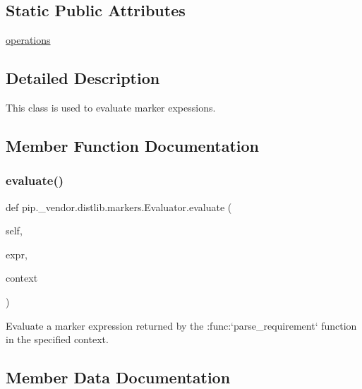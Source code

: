 \subsection*{Static Public Attributes}
\begin{DoxyCompactItemize}
\item 
\hyperlink{classpip_1_1__vendor_1_1distlib_1_1markers_1_1Evaluator_aa643b055c13248781a9455d64e7a45e0}{operations}
\end{DoxyCompactItemize}


\subsection{Detailed Description}
\begin{DoxyVerb}This class is used to evaluate marker expessions.
\end{DoxyVerb}
 

\subsection{Member Function Documentation}
\mbox{\label{classpip_1_1__vendor_1_1distlib_1_1markers_1_1Evaluator_aa4ac9be35d86c0601dfab712e2e47d5a}} 
\subsubsection{\texorpdfstring{evaluate()}{evaluate()}}
{\footnotesize\ttfamily def pip.\+\_\+vendor.\+distlib.\+markers.\+Evaluator.\+evaluate (\begin{DoxyParamCaption}\item[{}]{self,  }\item[{}]{expr,  }\item[{}]{context }\end{DoxyParamCaption})}

\begin{DoxyVerb}Evaluate a marker expression returned by the :func:`parse_requirement`
function in the specified context.
\end{DoxyVerb}
 

\subsection{Member Data Documentation}
\mbox{\label{classpip_1_1__vendor_1_1distlib_1_1markers_1_1Evaluator_aa643b055c13248781a9455d64e7a45e0}} 
